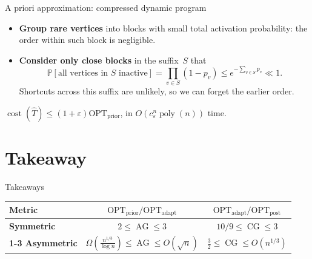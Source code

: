 \documentclass[aspectratio=169,12pt]{beamer}
\newcommand{\OPT}{\mathrm{OPT}}
\newcommand{\optpost}{\OPT_{\mathrm{post}}}
\newcommand{\optadapt}{\OPT_{\mathrm{adapt}}}
\newcommand{\optprior}{\OPT_{\mathrm{prior}}}
\newcommand{\Pp}{\mathbb{P}}
\newcommand{\cost}{\operatorname{cost}}
\newcommand{\poly}{\operatorname{poly}}
\begin{document}
\begin{frame}{A priori approximation: compressed dynamic program}
  {\centering
    \resizebox{0.82\linewidth}{!}{\ThDPBlocks}\par
  }

  \begin{itemize}\small\setlength{\itemsep}{0.65em}
    \item \textbf{Group rare vertices} into blocks with small total activation
      probability: the order within such block is negligible.
    \item \textbf{Consider only close blocks} in the suffix~\(S\) that
      \[
        \Pp[\text{all vertices in }S\text{ inactive}]
        =\prod_{v\in S}(1-p_v)
        \le e^{-\sum_{v\in S}p_v}\ll1.
      \]
      Shortcuts across this suffix are unlikely, so we can forget the
      earlier order.
  \end{itemize}

    \centering
    \(\cost(\widehat T)\le(1+\varepsilon)\optprior\),
    in \(O(c_\varepsilon^n\poly(n))\) time.\par
\end{frame}

\section{Takeaway}

\begin{frame}{Takeaways}
  \centering

  \vspace{0.08cm}
  \renewcommand{\arraystretch}{1.52}
  \setlength{\tabcolsep}{12pt}
  \begin{tabular}{>{\bfseries}lcc}
    \toprule
    Metric & \(\optprior/\optadapt\) & \(\optadapt/\optpost\) \\
    \midrule
    Symmetric
      & \(2\le\operatorname{AG}\le3\)
      & \(10/9\le\operatorname{CG}\le3\) \\
    \cmidrule(lr){1-3}
    Asymmetric
      & \(\displaystyle
          \Omega(\frac{n^{1/3}}{\log n})
          \le \operatorname{AG}
          \le O(\sqrt n)\)
      & \(\displaystyle
          \frac32
          \le \operatorname{CG}
          \le O(n^{1/3})\) \\
    \bottomrule
  \end{tabular}
\end{frame}
\end{document}
